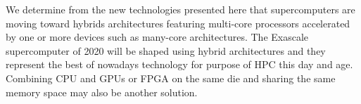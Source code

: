 We determine from the new technologies presented here that supercomputers are moving toward hybrids architectures featuring multi-core processors accelerated by one or more devices such as many-core architectures. 
The Exascale supercomputer of 2020 will be shaped using hybrid architectures and they represent the best of nowadays technology for purpose of HPC this day and age. 
Combining CPU and GPUs or FPGA on the same die and sharing the same memory space may also be another solution.

